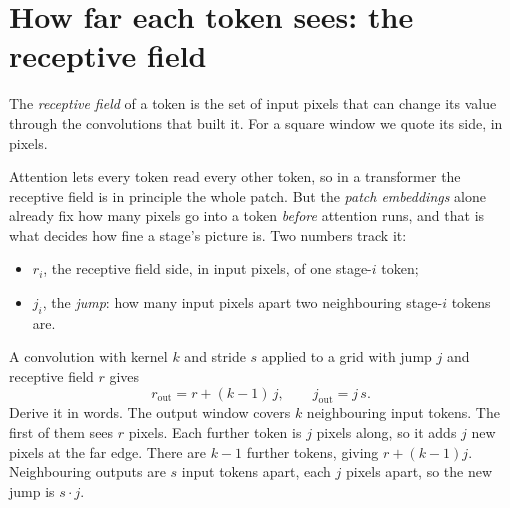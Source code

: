 \section{How far each token sees: the receptive field}\label{sec:encoder:rf}

\begin{definition}
The \emph{receptive field} of a token is the set of input pixels that can
change its value through the convolutions that built it. For a square window we quote its side, in
pixels.
\end{definition}

Attention lets every token read every other token, so in a transformer the receptive field is in
principle the whole patch. But the \emph{patch embeddings} alone already fix how many pixels go into a
token \emph{before} attention runs, and that is what decides how fine a stage's picture is. Two numbers
track it:
\begin{itemize}
\item $r_i$, the receptive field side, in input pixels, of one stage-$i$ token;
\item $j_i$, the \emph{jump}: how many input pixels apart two neighbouring stage-$i$ tokens are.
\end{itemize}

A convolution with kernel $k$ and stride $s$ applied to a grid with jump $j$ and receptive field $r$
gives
\begin{equation}\label{eq:encoder:rf}
r_{\text{out}} = r + (k - 1)\, j, \qquad j_{\text{out}} = j \, s .
\end{equation}
Derive it in words. The output window covers $k$ neighbouring input tokens. The first of them sees $r$
pixels. Each further token is $j$ pixels along, so it adds $j$ new pixels at the far edge. There are
$k - 1$ further tokens, giving $r + (k-1)j$. Neighbouring outputs are $s$ input tokens apart, each $j$
pixels apart, so the new jump is $s \cdot j$.


